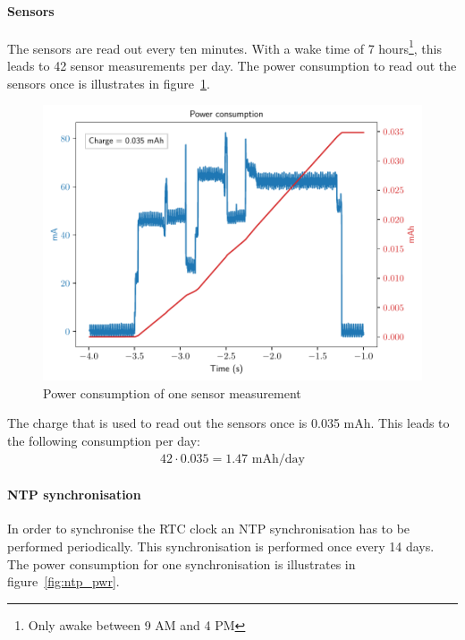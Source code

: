 \documentclass[11pt,a4paper]{article}
\begin{document}
\paragraph{Sensors}
The sensors are read out every ten minutes. With a wake time of 7 hours\footnote{Only awake between 9 AM and 4 PM}, this leads to 42 sensor measurements per day. The power consumption to read out the sensors once is illustrates in figure~\ref{fig:sens_pwr}.

\begin{figure}[H]
	\centering
	\includegraphics[width=1.0\linewidth]{sensor_pwr.pdf}
	\caption{Power consumption of one sensor measurement}
	\label{fig:sens_pwr}
\end{figure}

The charge that is used to read out the sensors once is 0.035 mAh. This leads to the following consumption per day:
\begin{gather*}
	42 \cdot 0.035 = 1.47\text{ mAh/day}
\end{gather*}

\paragraph{NTP synchronisation}
In order to synchronise the RTC clock an NTP synchronisation has to be performed periodically. This synchronisation is performed once every 14 days. The power consumption for one synchronisation is illustrates in figure~\ref{fig:ntp_pwr}.
\end{document}
